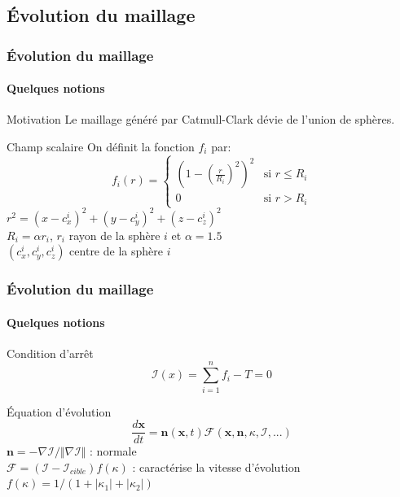 \documentclass[9pt]{beamer}
\begin{document}
\subsection{Évolution du maillage}

\begin{frame}
	\frametitle{Évolution du maillage}
	\framesubtitle{Quelques notions}
	
	\begin{block}{Motivation}
		Le maillage généré par Catmull-Clark dévie de l'union de sphères.
	\end{block}
	
	\begin{block}{Champ scalaire}
		On définit la fonction $f_i$ par:
		\begin{equation*}
  			f_i(r)=
     			\begin{cases}
        			\left(1 - \left(\frac{r}{R_i}\right)^2 \right)^2 & \text{si $r \le R_i$} \\
        			0 & \text{si $r > R_i$}
     			\end{cases}
		\end{equation*}
		$r^2 = (x - c_x^i)^2 + (y - c_y^i)^2 + (z - c_z^i)^2$ \\
		$R_i = \alpha r_i$, $r_i$ rayon de la sphère $i$ et $\alpha = 1.5$ \\
		$(c_x^i, c_y^i, c_z^i)$ centre de la sphère $i$
	
	\end{block}
\end{frame}

\begin{frame}
	\frametitle{Évolution du maillage}
	\framesubtitle{Quelques notions}
	
	\begin{block}{Condition d'arrêt}
		\begin{equation*}
			\mathcal{I}(x) = \sum_{i=1}^{n} f_i - T = 0
		\end{equation*}
	\end{block}
	
	\begin{block}{Équation d'évolution}
		\begin{equation*}
			\frac{d\textbf{x}}{dt} = \textbf{n}(\textbf{x}, t) \mathcal{F}(\textbf{x}, \textbf{n}, \kappa, \mathcal{I}, ...)		
		\end{equation*}
		$\textbf{n} = -\nabla\mathcal{I} / \Vert\nabla\mathcal{I}\Vert$ : normale \\
		$\mathcal{F} = ( \mathcal{I} - \mathcal{I}_{cible} ) f(\kappa)$ : caractérise la vitesse d'évolution \\
		$f(\kappa) = 1 / (1 + |\kappa_1| + |\kappa_2|)$
	\end{block}
\end{frame}
\end{document}
